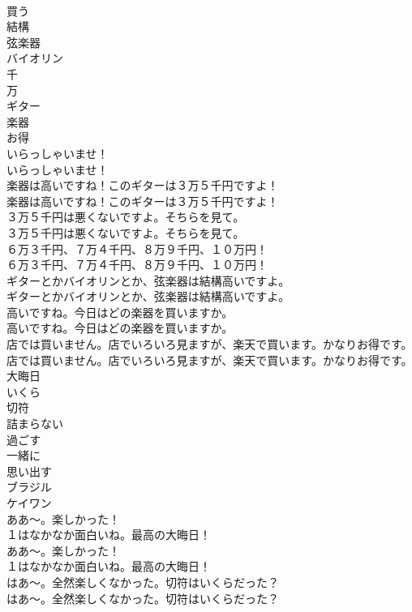 \documentclass[8pt]{extreport}
\begin{document}
\begin{CJK}{UTF8}{min}
\\	買う
\\	結構
\\	弦楽器
\\	バイオリン
\\	千
\\	万
\\	ギター
\\	楽器
\\	お得
\\	いらっしゃいませ！	
\\	いらっしゃいませ！ 
\\	楽器は高いですね！このギターは３万５千円ですよ！	
\\	楽器は高いですね！このギターは３万５千円ですよ！ 
\\	３万５千円は悪くないですよ。そちらを見て。	
\\	３万５千円は悪くないですよ。そちらを見て。 
\\	６万３千円、７万４千円、８万９千円、１０万円！	
\\	６万３千円、７万４千円、８万９千円、１０万円！ 
\\	ギターとかバイオリンとか、弦楽器は結構高いですよ。	
\\	ギターとかバイオリンとか、弦楽器は結構高いですよ。 
\\	高いですね。今日はどの楽器を買いますか。	
\\	高いですね。今日はどの楽器を買いますか。 
\\	店では買いません。店でいろいろ見ますが、楽天で買います。かなりお得です。	
\\	店では買いません。店でいろいろ見ますが、楽天で買います。かなりお得です。 
\\	大晦日
\\	いくら
\\	切符
\\	詰まらない
\\	過ごす
\\	一緒に
\\	思い出す
\\	ブラジル
\\	ケイワン
\\	ああ〜。楽しかった！
\\	１はなかなか面白いね。最高の大晦日！	
\\	ああ〜。楽しかった！
\\	１はなかなか面白いね。最高の大晦日！ 
\\	はあ〜。全然楽しくなかった。切符はいくらだった？	
\\	はあ〜。全然楽しくなかった。切符はいくらだった？ 

\end{CJK}
\end{document}
